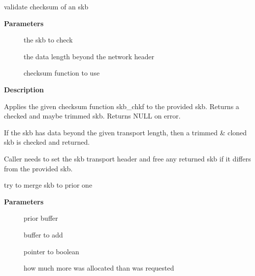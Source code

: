 \documentclass[a4paper,8pt,english]{sphinxmanual}
\begin{document}
\begin{fulllineitems}
\label{networking/kapi:c.skb_checksum_trimmed}
validate checksum of an skb

\end{fulllineitems}


\textbf{Parameters}
\begin{description}
\item[{}] \leavevmode
the skb to check

\item[{}] \leavevmode
the data length beyond the network header

\item[{}] \leavevmode
checksum function to use

\end{description}

\textbf{Description}

Applies the given checksum function skb\_chkf to the provided skb.
Returns a checked and maybe trimmed skb. Returns NULL on error.

If the skb has data beyond the given transport length, then a
trimmed \& cloned skb is checked and returned.

Caller needs to set the skb transport header and free any returned skb if it
differs from the provided skb.

\begin{fulllineitems}
\label{networking/kapi:c.skb_try_coalesce}
try to merge skb to prior one

\end{fulllineitems}


\textbf{Parameters}
\begin{description}
\item[{}] \leavevmode
prior buffer

\item[{}] \leavevmode
buffer to add

\item[{}] \leavevmode
pointer to boolean

\item[{}] \leavevmode
how much more was allocated than was requested

\end{description}
\end{document}
